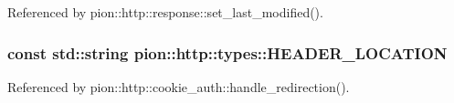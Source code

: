 Referenced by pion\-::http\-::response\-::set\-\_\-last\-\_\-modified().

\hypertarget{structpion_1_1http_1_1types_a3d86eec9408f000aa26f84f7f6e4a098}{
\subsubsection[{H\-E\-A\-D\-E\-R\-\_\-\-L\-O\-C\-A\-T\-I\-O\-N}]{\setlength{\rightskip}{0pt plus 5cm}const std\-::string pion\-::http\-::types\-::\-H\-E\-A\-D\-E\-R\-\_\-\-L\-O\-C\-A\-T\-I\-O\-N\hspace{0.3cm}{\ttfamily [static]}}}\label{structpion_1_1http_1_1types_a3d86eec9408f000aa26f84f7f6e4a098}


Referenced by pion\-::http\-::cookie\-\_\-auth\-::handle\-\_\-redirection().


